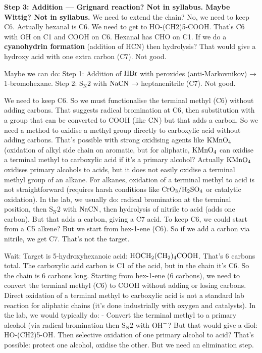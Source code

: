 \documentclass[11pt]{article}
\begin{document}
\begin{corrige}
\textbf{Step 3: Addition — Grignard reaction? Not in syllabus. Maybe Wittig? Not in syllabus.}
We need to extend the chain? No, we need to keep C6. Actually hexanal is C6. We need to get to HO-(CH2)5-COOH. That's C6 with OH on C1 and COOH on C6. Hexanal has CHO on C1. If we do a \textbf{cyanohydrin formation} (addition of HCN) then hydrolysis? That would give a hydroxy acid with one extra carbon (C7). Not good.

Maybe we can do:
Step 1: Addition of \(\ce{HBr}\) with peroxides (anti-Markovnikov) → 1-bromohexane.
Step 2: \(\mathrm{S_N2}\) with \(\ce{NaCN}\) → heptanenitrile (C7). Not good.

We need to keep C6. So we must functionalise the terminal methyl (C6) without adding carbons. That suggests radical bromination at C6, then substitution with a group that can be converted to COOH (like \(\ce{CN}\)) but that adds a carbon. So we need a method to oxidise a methyl group directly to carboxylic acid without adding carbons. That's possible with strong oxidising agents like \(\ce{KMnO4}\) (oxidation of alkyl side chain on aromatic, but for aliphatic, \(\ce{KMnO4}\) can oxidise a terminal methyl to carboxylic acid if it's a primary alcohol? Actually \(\ce{KMnO4}\) oxidises primary alcohols to acids, but it does not easily oxidise a terminal methyl group of an alkane. For alkanes, oxidation of a terminal methyl to acid is not straightforward (requires harsh conditions like \(\ce{CrO3}/\ce{H2SO4}\) or catalytic oxidation). In the lab, we usually do: radical bromination at the terminal position, then \(\mathrm{S_N2}\) with \(\ce{NaCN}\), then hydrolysis of nitrile to acid (adds one carbon). But that adds a carbon, giving a C7 acid. To keep C6, we could start from a C5 alkene? But we start from hex-1-ene (C6). So if we add a carbon via nitrile, we get C7. That's not the target.

Wait: Target is 5-hydroxyhexanoic acid: \(\ce{HOCH2(CH2)4COOH}\). That's 6 carbons total. The carboxylic acid carbon is C1 of the acid, but in the chain it's C6. So the chain is 6 carbons long. Starting from hex-1-ene (6 carbons), we need to convert the terminal methyl (C6) to COOH without adding or losing carbons. Direct oxidation of a terminal methyl to carboxylic acid is not a standard lab reaction for aliphatic chains (it's done industrially with oxygen and catalysts). In the lab, we would typically do: 
- Convert the terminal methyl to a primary alcohol (via radical bromination then \(\mathrm{S_N2}\) with \(\ce{OH-}\)? But that would give a diol: HO-(CH2)5-OH. Then selective oxidation of one primary alcohol to acid? That's possible: protect one alcohol, oxidise the other. But we need an elimination step.


\end{corrige}
\end{document}
